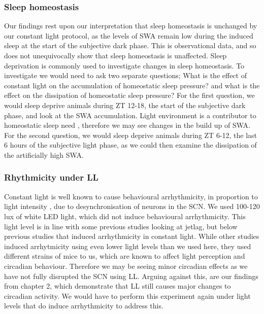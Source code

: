 \subsubsection{Sleep homeostasis}
Our findings rest upon our interpretation that sleep homeostasis
is unchanged by our constant light protocol, 
as the levels of SWA remain low during the induced sleep at the 
start of the subjective dark phase.
This is observational data, and so does not unequivocally show
that sleep homeostasis is unaffected.
Sleep deprivation is commonly
used to investigate changes in sleep 
homeostasis\cite{vyazovskiy_sleep_2007}.
To investigate 
we would need to ask two separate questions; What is the effect
of constant light on the accumulation of homeostatic sleep 
pressure? and what is the effect on the dissipation of 
homeostatic sleep pressure?
For the first question, we would sleep deprive animals
during ZT 12-18, the start of the subjective dark phase,
and look at the SWA accumulation. 
Light environment is a contributor to homeostatic sleep need
\cite{vyazovskiy_sleep_2007, tsai_melanopsin_2009}, therefore 
we may see changes in the build up of SWA.
For the second question, we would sleep deprive animals during  
ZT 6-12, the last 6 hours of the subjective light phase, as we 
could then examine the dissipation of the artificially high SWA.

\subsubsection{Rhythmicity under LL}
Constant light is well known to cause behavioural arrhythmicity,
in proportion to light intensity
\cite{chen_strong_2008, aschoff_exogenous_1960},
due to desynchronisation of neurons in the 
SCN\cite{ohta_constant_2005}.
We used 100-120 lux of white LED light, which did not induce
behavioural arrhythmicity.
This light level is in line with some previous studies 
looking at jetlag\cite{loh_rapid_2010}, but below previous
studies that induced arrhythmicity in constant 
light\cite{ohta_constant_2005, chen_strong_2008}.
While other studies induced arrhytmicity using even
lower light levels than we used here\cite{munoz_long-term_2005,
sudo_constant_2003}, they used different strains of 
mice to us, which are known to affect
light perception and circadian behaviour\cite{peirson_light_2018}.
Therefore we may be seeing minor circadian effects as 
we have not fully disrupted the SCN using LL.
Arguing against this, are our findings from chapter 2, 
which demonstrate that LL still causes major changes to 
circadian activity.
We would have to perform this experiment again under 
light levels that do induce arrhythmicity to address this. 

